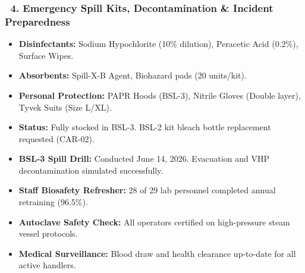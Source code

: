 \documentclass[10pt,a4paper]{scrartcl}
\begin{document}
\subsubsection*{\textcolor{NavyPrimary}{\faLock\ 4. Emergency Spill Kits, Decontamination \& Incident Preparedness}}

\begin{minipage}[t]{0.48\textwidth}
    \begin{tcolorbox}[auditcard, title=\textcolor{NavyPrimary}{\bfseries\scriptsize\faExclamationTriangle\ Biological Spill Kit Inventory Check}]
        {\small
        \begin{itemize}[leftmargin=12pt, itemsep=2pt, topsep=2pt]
            \item \textbf{Disinfectants:} Sodium Hypochlorite (10\% dilution), Peracetic Acid (0.2\%), Surface Wipes.
            \item \textbf{Absorbents:} Spill-X-B Agent, Biohazard pads (20 units/kit).
            \item \textbf{Personal Protection:} PAPR Hoods (BSL-3), Nitrile Gloves (Double layer), Tyvek Suits (Size L/XL).
            \item \textbf{Status:} Fully stocked in BSL-3. BSL-2 kit bleach bottle replacement requested (CAR-02).
        \end{itemize}
        }
    \end{tcolorbox}
\end{minipage}%
\hfill
\begin{minipage}[t]{0.48\textwidth}
    \begin{tcolorbox}[auditcard, title=\textcolor{NavyPrimary}{\bfseries\scriptsize\faFireExtinguisher\ Safety Drill \& Training Compliance}]
        {\small
        \begin{itemize}[leftmargin=12pt, itemsep=2pt, topsep=2pt]
            \item \textbf{BSL-3 Spill Drill:} Conducted June 14, 2026. Evacuation and VHP decontamination simulated successfully.
            \item \textbf{Staff Biosafety Refresher:} 28 of 29 lab personnel completed annual retraining (96.5\%).
            \item \textbf{Autoclave Safety Check:} All operators certified on high-pressure steam vessel protocols.
            \item \textbf{Medical Surveillance:} Blood draw and health clearance up-to-date for all active handlers.
        \end{itemize}
        }
    \end{tcolorbox}
\end{minipage}
\end{document}
